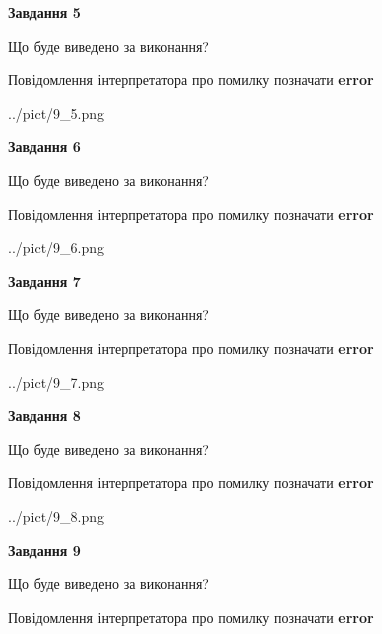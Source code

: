 \documentclass[11pt, ukrainian]{article}
\begin{document}
{\begin {large}
{\begin {center}\textbf{Завдання 5}\end {center}}\par
Що буде виведено за виконання? \par
Повідомлення інтерпретатора про помилку позначати \textbf{error}

\begin{center}
	{../pict/9_5.png}
\end{center}
\newpage

{\begin {center}\textbf{Завдання 6}\end {center}}\par
Що буде виведено за виконання? \par
Повідомлення інтерпретатора про помилку позначати \textbf{error}

\begin{center}
	{../pict/9_6.png}
\end{center}
\newpage

{\begin {center}\textbf{Завдання 7}\end {center}}\par
Що буде виведено за виконання? \par
Повідомлення інтерпретатора про помилку позначати \textbf{error}

\begin{center}
	{../pict/9_7.png}
\end{center}
\newpage

{\begin {center}\textbf{Завдання 8}\end {center}}\par
Що буде виведено за виконання? \par
Повідомлення інтерпретатора про помилку позначати \textbf{error}

\begin{center}
	{../pict/9_8.png}
\end{center}
\newpage

{\begin {center}\textbf{Завдання 9}\end {center}}\par
Що буде виведено за виконання? \par
Повідомлення інтерпретатора про помилку позначати \textbf{error}


\end{large}}
\end{document}
